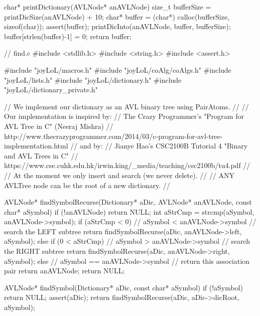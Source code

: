 char* printDictionary(AVLNode* anAVLNode) {
  size_t bufferSize = printDicSize(anAVLNode) + 10;
  char* buffer = (char*) calloc(bufferSize, sizeof(char));
  assert(buffer);
  printDicInto(anAVLNode, buffer, bufferSize);
  buffer[strlen(buffer)-1] = 0;
  return buffer;
}
\stoptyping

\starttyping
// find.c
#include <stdlib.h>
#include <string.h>
#include <assert.h>

#include "joyLoL/macros.h"
#include "joyLoL/coAlg/coAlgs.h"
#include "joyLoL/lists.h"
#include "joyLoL/dictionary.h"
#include "joyLoL/dictionary_private.h"

// We implement our dictionary as an AVL binary tree using PairAtoms.
//
// Our implementation is inspired by:
// The Crazy Programmer's "Program for AVL Tree in C" (Neeraj Mishra)
// http://www.thecrazyprogrammer.com/2014/03/c-program-for-avl-tree-implementation.html
// and by:
// Jianye Hao's CSC2100B Tutorial 4 "Binary and AVL Trees in C"
// https://www.cse.cuhk.edu.hk/irwin.king/_media/teaching/csc2100b/tu4.pdf
//
// At the moment we only insert and search (we never delete).
//
// ANY AVLTree node can be the root of a new dictionary.
//

AVLNode* findSymbolRecurse(Dictionary* aDic,
                           AVLNode* anAVLNode,
                           const char* aSymbol) {
  if (!anAVLNode) return NULL;
  int aStrCmp = strcmp(aSymbol, anAVLNode->symbol);
  if (aStrCmp < 0) {
    // aSymbol < anAVLNode->symbol // search the LEFT subtree
    return findSymbolRecurse(aDic, anAVLNode->left, aSymbol);
  } else if (0 < aStrCmp) {
    // aSymbol > anAVLNode->symbol // search the RIGHT subtree
    return findSymbolRecurse(aDic, anAVLNode->right, aSymbol);
  } else {
    // aSymbol == anAVLNode->symbol // return this association pair
    return anAVLNode;
  }
  return NULL;
}

AVLNode* findSymbol(Dictionary* aDic, const char* aSymbol) {
  if (!aSymbol) return NULL;
  assert(aDic);
  return findSymbolRecurse(aDic, aDic->dicRoot, aSymbol);
}

